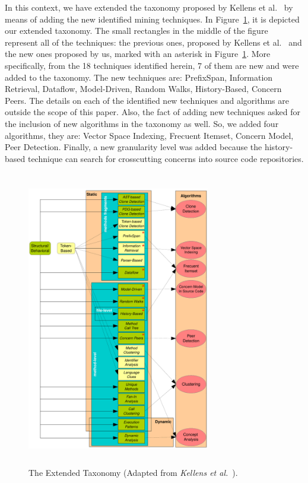 In this context, we have extended the taxonomy proposed by Kellens et al.~\cite{Kellens} by means of adding the new identified mining techniques. In Figure~\ref{taxonomy}, it is depicted our extended taxonomy. The small rectangles in the middle of the figure represent all of the techniques: the previous ones, proposed by Kellens et al.~\cite{Kellens} and the new ones proposed by us, marked with an asterisk in Figure~\ref{taxonomy}. More specifically, from the 18 techniques identified herein, 7 of them are new and were added to the taxonomy. The new techniques are: PrefixSpan, Information Retrieval, Dataflow, Model-Driven, Random Walks, History-Based, Concern Peers. The details on each of the identified new techniques and algorithms are outside the scope of this paper. Also, the fact of adding new techniques asked for the inclusion of new algorithms in the taxonomy as well. So, we added four algorithms, they are: Vector Space Indexing, Frecuent Itemset, Concern Model, Peer Detection. 
Finally, a new granularity level was added because the history-based technique can search for crosscutting concerns into source code repositories. 





\begin{figure}
\centering
  \includegraphics[width=8cm, height=13cm]{figuras/taxonomy}
\caption{The Extended Taxonomy (Adapted from \textit{Kellens et al.}~\cite{Kellens}).}
\label{taxonomy}
\end{figure} 